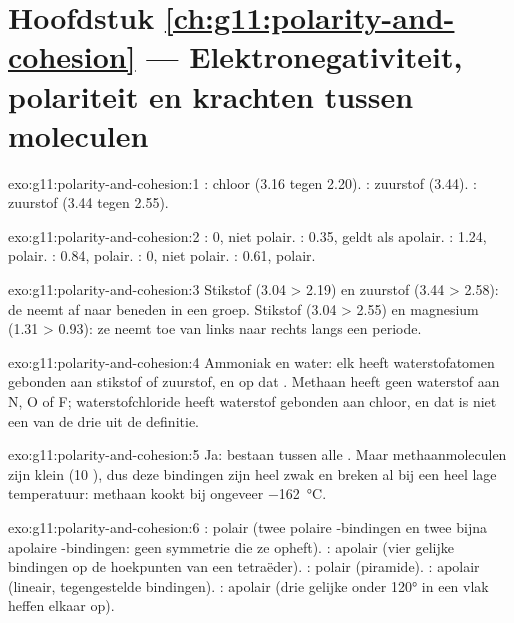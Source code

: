 \section*{Hoofdstuk \ref{ch:g11:polarity-and-cohesion} --- Elektronegativiteit, polariteit en krachten tussen moleculen}

\begin{solution}{exo:g11:polarity-and-cohesion:1}
: chloor (3.16 tegen 2.20). : zuurstof (3.44).
: zuurstof (3.44 tegen 2.55).
\end{solution}

\begin{solution}{exo:g11:polarity-and-cohesion:2}
: 0, niet polair. : 0.35, geldt als apolair. :
1.24, polair. : 0.84, polair. : 0, niet polair.
: 0.61, polair.
\end{solution}

\begin{solution}{exo:g11:polarity-and-cohesion:3}
Stikstof (3.04 > 2.19) en zuurstof (3.44 > 2.58): de 
neemt af naar beneden in een groep. Stikstof (3.04 > 2.55) en magnesium
(1.31 > 0.93): ze neemt toe van links naar rechts langs een periode.
\end{solution}

\begin{solution}{exo:g11:polarity-and-cohesion:4}
Ammoniak en water: elk heeft waterstofatomen gebonden aan stikstof of
zuurstof, en  op dat . Methaan heeft geen
waterstof aan N, O of F; waterstofchloride heeft waterstof gebonden aan
chloor, en dat is niet een van de drie  uit de definitie.
\end{solution}

\begin{solution}{exo:g11:polarity-and-cohesion:5}
Ja:  bestaan tussen alle . Maar
methaanmoleculen zijn klein (10 ), dus deze bindingen zijn heel
zwak en breken al bij een heel lage temperatuur: methaan kookt bij
ongeveer \qty{-162}{\celsius}.
\end{solution}

\begin{solution}{exo:g11:polarity-and-cohesion:6}
: polair (twee polaire -bindingen en twee bijna
apolaire -bindingen: geen symmetrie die ze opheft). :
apolair (vier gelijke bindingen op de hoekpunten van een tetraëder).
: polair (piramide). : apolair (lineair, tegengestelde
bindingen). : apolair (drie gelijke  onder
\ang{120} in een vlak heffen elkaar op).
\end{solution}

